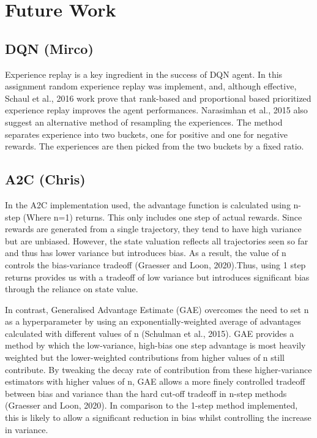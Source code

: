 \documentclass{article}
\begin{document}
\section{Future Work}

\subsection{DQN (Mirco)}
Experience replay is a key ingredient in the success of DQN agent. In this assignment random experience replay was implement, and, although effective, Schaul et al., 2016 work prove that rank-based and proportional based prioritized experience replay improves the agent performances. Narasimhan et al., 2015 also suggest an alternative method of resampling the experiences. The method separates experience into two buckets, one for positive and one for negative rewards. The experiences are then picked from the two buckets by a fixed ratio.

\subsection{A2C (Chris)}

In the A2C implementation used, the advantage function is calculated using n-step (Where n=1) returns. This only includes one step of actual rewards. Since rewards are generated from a single trajectory, they tend to have high variance but are unbiased. However, the state valuation reflects all trajectories seen so far and thus has lower variance but introduces bias. As a result, the value of n controls the bias-variance tradeoff (Graesser and Loon, 2020).Thus, using 1 step returns provides us with a tradeoff of low variance but introduces significant bias through the reliance on state value.

In contrast, Generalised Advantage Estimate (GAE) overcomes the need to set n as a hyperparameter by using an exponentially-weighted average of advantages calculated with different values of n (Schulman et al., 2015). GAE provides a method by which the low-variance, high-bias one step advantage is most heavily weighted but the lower-weighted contributions from higher values of n still contribute. By tweaking the decay rate of contribution from these higher-variance estimators with higher values of n, GAE allows a more finely controlled tradeoff between bias and variance than the hard cut-off tradeoff in n-step methods (Graesser and Loon, 2020). In comparison to the 1-step method implemented, this is likely to allow a significant reduction in bias whilst controlling the increase in variance.
\end{document}
